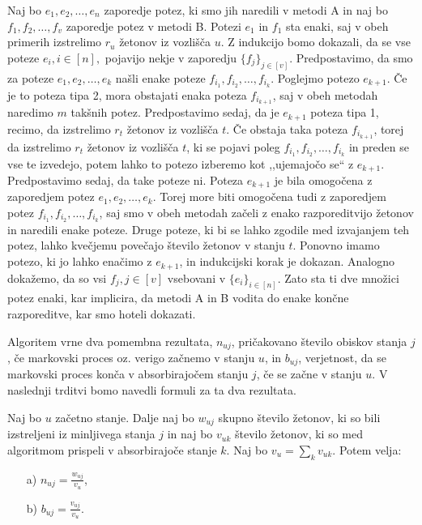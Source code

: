 \documentclass[twoside,11pt]{article}
\begin{document}
\indent Naj bo $e_{1},e_{2},\ldots,e_{n}$ zaporedje potez, ki smo jih naredili v metodi A in naj bo $f_{1},f_{2},\ldots,f_{v}$ zaporedje potez v metodi B. Potezi $e_{1}$ in $f_{1}$ sta enaki, saj v obeh primerih izstrelimo $r_{u}$ žetonov iz vozlišča $u$. Z indukcijo bomo dokazali, da se vse poteze $e_{i}, i \in [n], $ pojavijo nekje v zaporedju $\{ f_{j}\} _{j\in [v] }$. Predpostavimo, da smo za poteze $e_{1},e_{2},\ldots,e_{k}$ našli enake poteze $f_{i_1},f_{i_2},\ldots,f_{i_k}$. Poglejmo potezo $e_{k+1}$. Če je to poteza tipa 2, mora obstajati enaka poteza $f_{i_{k+1}}$, saj v obeh metodah naredimo $m$ takšnih potez.
Predpostavimo sedaj, da je $e_{k+1}$ poteza tipa 1, recimo, da izstrelimo $r_{t}$ žetonov iz vozlišča $t$. Če obstaja taka poteza $f_{i_{k+1}}$, torej da izstrelimo $r_{t}$ žetonov iz vozlišča $t$, ki se pojavi poleg $f_{i_1},f_{i_2},\ldots,f_{i_k}$ in preden se vse te izvedejo, potem lahko to potezo izberemo kot ,,ujemajočo se`` z $e_{k+1}$. Predpostavimo sedaj, da take poteze ni. Poteza $e_{k+1}$ je bila omogočena z zaporedjem potez $e_{1},e_{2},\ldots,e_{k}$. Torej more biti omogočena tudi z zaporedjem potez $f_{i_1},f_{i_2},\ldots,f_{i_k}$, saj smo v obeh metodah začeli z enako razporeditvijo žetonov in naredili enake poteze. Druge poteze, ki bi se lahko zgodile med izvajanjem teh potez, lahko kvečjemu povečajo število žetonov v stanju $t$. 
Ponovno imamo potezo, ki jo lahko enačimo z $e_{k+1}$, in indukcijski korak je dokazan. Analogno dokažemo, da so vsi $f_{j}, j \in [v] $ vsebovani v $\{e_{i} \}_{i\in [n] }$. Zato sta ti dve množici potez enaki, kar implicira, da metodi A in B vodita do enake končne razporeditve, kar smo hoteli dokazati.
\hfill \QED

\vspace{\baselineskip}

Algoritem vrne dva pomembna rezultata, $n_{uj}$, pričakovano število obiskov stanja $j$, če markovski proces oz.\,\,verigo začnemo v stanju $u$, in $b_{uj}$, verjetnost, da se markovski proces konča v absorbirajočem stanju $j$, če se začne v stanju $u$. V naslednji trditvi bomo navedli formuli za ta dva rezultata.

\begin{trditev}\label{formule}
    Naj bo $u$ začetno stanje. Dalje naj bo $w_{uj}$ skupno število žetonov, ki so bili izstreljeni iz minljivega stanja $j$ in naj bo $v_{uk}$ število žetonov, ki so med algoritmom prispeli v absorbirajoče stanje $k$. Naj bo $v_{u} = \sum_{k} v_{uk}$. Potem velja: 
    \begin{enumerate}
        \item[a)] $n_{uj} = \frac{w_{uj}}{v_{u}}$,
        \item[b)] $b_{uj} = \frac{v_{uj}}{v_{u}}$.
    \end{enumerate}

\end{trditev}
\end{document}
